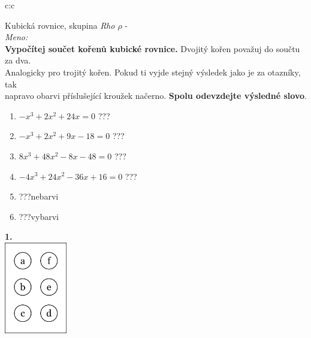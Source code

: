 \documentclass[10pt]{report}
\begin{document}
\begin{tabular}{c:c}
\begin{minipage}[c][99mm][t]{0.49\linewidth}
\begin{center}
\vspace{7mm}
{\huge Kubická rovnice, skupina \textit{Rho $\rho$} -}\\[4.5mm]
\textit{Meno:}\phantom{xxxxxxxxxxxxxxxxxxxxxxxxxxxxxxxxxxxxxxxxxxxxxxxxxxxxxxxxxxxxxxxxx}\\[3.5mm]
\textbf{Vypočítej součet kořenů kubické rovnice.} Dvojitý kořen považuj do součtu za dva.\\Analogicky pro trojitý kořen. Pokud ti vyjde stejný výsledek jako je za otazníky, tak\\napravo obarvi příslušející kroužek načerno. \textbf{Spolu odevzdejte výsledné slovo}.\\[3mm]
\begin{minipage}{0.77\linewidth}
\begin{center}
\begin{varwidth}{\textwidth}
\begin{enumerate}
\large
\item $-x^3+2x^2+24x=0$\quad \dotfill\; ???\;\dotfill {}
\item $-x^3+2x^2+9x-18=0$\quad \dotfill\; ???\;\dotfill {}
\item $8x^3+48x^2-8x-48=0$\quad \dotfill\; ???\;\dotfill {}
\item $-4x^3+24x^2-36x+16=0$\quad \dotfill\; ???\;\dotfill {}
\item \quad \dotfill\; ???\;\dotfill \quad nebarvi
\item \quad \dotfill\; ???\;\dotfill \quad vybarvi
\end{enumerate}
\end{varwidth}
\end{center}
\end{minipage}
\begin{minipage}{0.20\linewidth}
\begin{center}
{\Huge\bfseries 1.} \\[2mm]
\includegraphics[height=40mm]{../images/braille.png}

\end{center}
\end{minipage}
\end{center}
\end{minipage}
\end{tabular}
\end{document}
